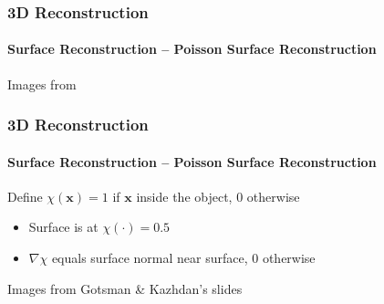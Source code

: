 \documentclass[xetex,professionalfont]{beamer}
\renewcommand{\vec}[1]{\ensuremath{\mathbf{#1}}}
\newcommand{\vx}{\vec{x}}
\begin{document}

\begin{frame}
\frametitle{3D Reconstruction}
\framesubtitle{Surface Reconstruction -- Poisson Surface Reconstruction}

\begin{center}
    {\centering Images from \cite{kazhdan2006}}
\end{center}

\end{frame}


\begin{frame}
\frametitle{3D Reconstruction}
\framesubtitle{Surface Reconstruction -- Poisson Surface Reconstruction}

Define $\chi(\vx)=1$ if $\vx$ inside the object, $0$ otherwise
\begin{itemize}
    \item Surface is at $\chi(\cdot)=0.5$
    \item $\nabla\chi$ equals surface normal near surface, $0$ otherwise
\end{itemize}

\bigskip
\begin{center}
    {\centering Images from Gotsman \& Kazhdan's slides}
\end{center}

\end{frame}
\end{document}
